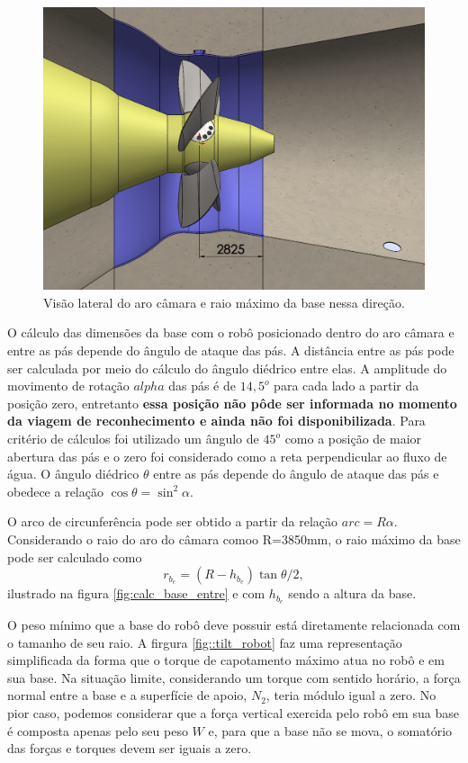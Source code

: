 \begin{figure}[h!]
\centering
	\includegraphics[width=0.9\columnwidth]{figs/base/turbine_side}
	\caption{Visão lateral do aro câmara e raio máximo da base nessa direção.}
	\label{fig::turbine_side}
\end{figure}

O cálculo das dimensões da base com o robô posicionado dentro do aro câmara e
entre as pás depende do ângulo de ataque das pás. A distância entre as pás pode
ser calculada por meio do cálculo do ângulo diédrico entre elas. A amplitude do movimento de rotação $alpha$ 
das pás é de $14,5^o$ para cada lado a partir da posição zero, entretanto \textbf{essa posição não pôde ser
informada no momento da viagem de reconhecimento e ainda não foi
disponibilizada}. Para critério de cálculos foi utilizado um ângulo de
$45^o$ como a posição de maior abertura das pás e o zero foi considerado como
a reta perpendicular ao fluxo de água. O ângulo diédrico $\theta$ entre as pás
depende do ângulo de ataque das pás e obedece a relação $\cos{\theta} =
\sin^2{\alpha}.$

O arco de circunferência pode ser obtido a partir da relação $arc=R\alpha$.
Considerando o raio do aro do câmara comoo R=3850mm, o raio máximo da base pode
ser calculado como $$r_{b_e} = (R - h_{b_e})\tan{\theta/2},$$  ilustrado na figura
\ref{fig:calc_base_entre} e com $h_{b_e}$ sendo a altura da base.

O peso mínimo que a base do robô deve possuir está diretamente relacionada com o
tamanho de seu raio. A firgura \ref{fig::tilt_robot} faz uma representação
simplificada da forma que o torque de capotamento máximo atua no robô e em sua
base. Na situação limite, considerando um torque com sentido horário, a força
normal entre a base e a superfície de apoio, $N_2$, teria módulo igual a zero.
No pior caso, podemos considerar que a força vertical exercida pelo robô em sua
base é composta apenas pelo seu peso $W$ e, para que a base não se mova, o
somatório das forças e torques devem ser iguais a zero.

